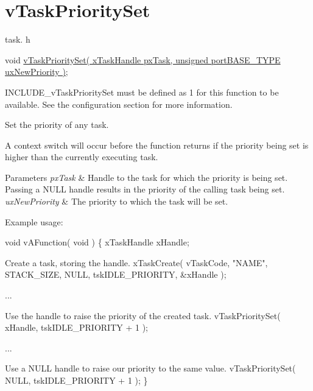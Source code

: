 \hypertarget{group__v_task_priority_set}{\section{v\-Task\-Priority\-Set}
\label{group__v_task_priority_set}
}
task. h 
\begin{DoxyPre}void \hyperlink{win32_2win32_2_libraries_2_free_r_t_o_s_2_source_2tasks_8c_a9583c33af329e2a91b447641cce364cd}{vTaskPrioritySet( xTaskHandle pxTask, unsigned portBASE\_TYPE uxNewPriority )};\end{DoxyPre}


I\-N\-C\-L\-U\-D\-E\-\_\-v\-Task\-Priority\-Set must be defined as 1 for this function to be available. See the configuration section for more information.

Set the priority of any task.

A context switch will occur before the function returns if the priority being set is higher than the currently executing task.


\begin{DoxyParams}{Parameters}
{\em px\-Task} & Handle to the task for which the priority is being set. Passing a N\-U\-L\-L handle results in the priority of the calling task being set.\\
\hline
{\em ux\-New\-Priority} & The priority to which the task will be set.\\
\hline
\end{DoxyParams}
Example usage\-: 
\begin{DoxyPre}
 void vAFunction( void )
 \{
 xTaskHandle xHandle;\end{DoxyPre}



\begin{DoxyPre}Create a task, storing the handle.
         xTaskCreate( vTaskCode, "NAME", STACK\_SIZE, NULL, tskIDLE\_PRIORITY, \&xHandle );\end{DoxyPre}



\begin{DoxyPre}...\end{DoxyPre}



\begin{DoxyPre}Use the handle to raise the priority of the created task.
         vTaskPrioritySet( xHandle, tskIDLE\_PRIORITY + 1 );\end{DoxyPre}



\begin{DoxyPre}...\end{DoxyPre}



\begin{DoxyPre}Use a NULL handle to raise our priority to the same value.
         vTaskPrioritySet( NULL, tskIDLE\_PRIORITY + 1 );
 \}
   \end{DoxyPre}
 